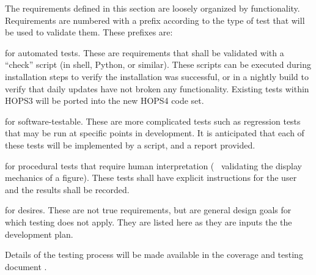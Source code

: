 The requirements defined in this section are loosely organized by functionality.
Requirements are numbered with a prefix according to
the type of test that will be used to validate them.  These prefixes are:
\begin{description}
[align=left, labelwidth=0.0cm, leftmargin=1cm]
\item[A,] for automated tests. These are requirements
that shall be validated with a ``check'' script (in shell, Python, or similar).
These scripts can be executed during installation steps to verify the
installation was successful,
or in a nightly build to verify that daily updates have not broken any
functionality. Existing tests within HOPS3 will be ported into the new
HOPS4 code set.

\item[S,] for software-testable. These are more complicated tests such as
regression tests that may be run at specific points in development. It is
anticipated that each of these tests will be implemented by a script, and a report provided.

\item[P,] for procedural tests that require human interpretation (\eg~
validating the display mechanics of a figure). These tests shall have
explicit instructions for the user and the results shall be recorded.

\item[D,] for desires. These are not true requirements, but are general
design goals for which testing does not apply.  They are listed here as
they are inputs the the development plan.


\end{description}

Details of the testing process will be made available in the coverage
and testing document \cite{cover}.

